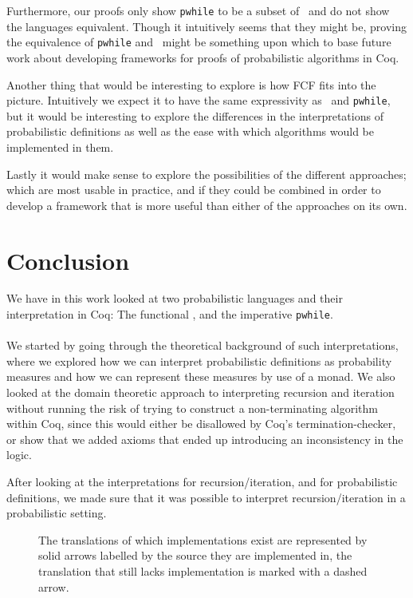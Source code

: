 \documentclass[11pt, leqno, titlepage]{article}
\theoremstyle{definition}
\begin{document}
Furthermore, our proofs only show \texttt{pwhile} to be a subset of \rml\ and do not
show the languages equivalent. Though it intuitively seems that they might be,
proving the equivalence of \texttt{pwhile} and \rml\ might be something upon which to
base future work about developing frameworks for proofs of probabilistic algorithms
in Coq.

Another thing that would be interesting to explore is how FCF fits into the
picture. Intuitively we expect it to have the same expressivity as \rml\ and
\texttt{pwhile}, but it would be interesting to explore the differences in the
interpretations of probabilistic definitions as well as the ease with which algorithms
would be implemented in them.

Lastly it would make sense to explore the possibilities of the different approaches;
which are most usable in practice, and if they could be combined in order to develop
a framework that is more useful than either of the approaches on its own. 

\section{Conclusion}
\label{sec:conclusion}
We have in this work looked at two probabilistic languages and their interpretation
in Coq: The functional \rml, and the imperative \texttt{pwhile}.\\
\\
We started by going through the theoretical background of such interpretations, where
we explored how we can interpret probabilistic definitions as probability measures
and how we can represent these measures by use of a monad. We also looked at the
domain theoretic approach to interpreting recursion and iteration without running the
risk of trying to construct a non-terminating algorithm within Coq, since this would
either be disallowed by Coq's termination-checker, or show that we added axioms that
ended up introducing an inconsistency in the logic.

After looking at the interpretations for recursion/iteration, and for probabilistic
definitions, we made sure that it was possible to interpret recursion/iteration in a
probabilistic setting.
\begin{figure}[h]
  \centering
  \caption{The translations of which implementations exist are represented by solid
    arrows labelled by the source they are implemented in, the translation that still
    lacks implementation is marked with a dashed arrow. }
  \label{fig:triangle-ours}
\end{figure}
\end{document}
